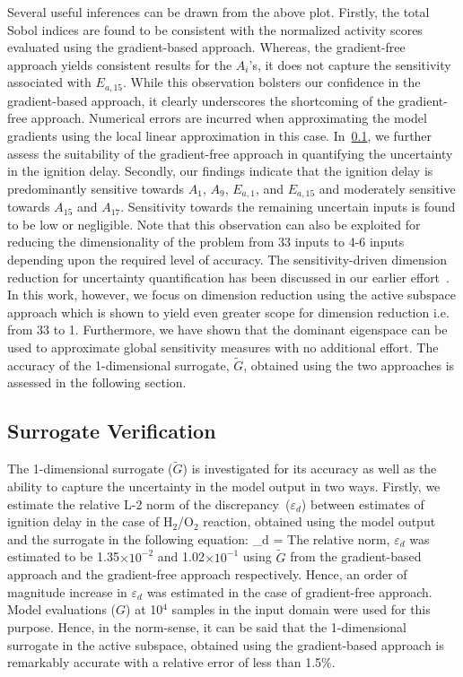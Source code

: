 Several useful inferences can be drawn from the above plot. Firstly, the total Sobol indices are found to be
consistent
with the normalized activity scores evaluated using the gradient-based approach. Whereas, the gradient-free
approach yields consistent results for the $A_i$'s, it does not capture the sensitivity associated with
$E_{a,15}$. While this observation bolsters our confidence in the gradient-based approach, it clearly
underscores the shortcoming of the gradient-free approach. Numerical errors are incurred when approximating
the model gradients using the local linear approximation in this case. In~\ref{sub:verify}, we further assess the
suitability of the gradient-free approach in quantifying the uncertainty in the ignition delay. 
Secondly, our findings indicate that   
the ignition delay is predominantly sensitive towards $A_1$, $A_9$, $E_{a,1}$, and $E_{a,15}$ and 
moderately sensitive towards $A_{15}$ and $A_{17}$. Sensitivity towards the remaining uncertain inputs is
found to be low or negligible. Note that this observation can also be exploited for reducing the 
dimensionality of the problem from 33 inputs to 4-6 inputs depending upon the required level of accuracy.
The sensitivity-driven dimension reduction for uncertainty quantification has been
discussed in our earlier effort~\cite{Vohra:2018}. In this work, however, we focus on dimension reduction using the active 
subspace approach which is shown to yield even greater scope for dimension reduction i.e. from 33 to 1. Furthermore, we have
shown that the dominant eigenspace can be used to approximate global sensitivity measures with no additional effort.
The accuracy of the 1-dimensional surrogate, $\tilde{G}$, obtained using the two approaches is assessed in the following section. 

\subsection{Surrogate Verification}
\label{sub:verify}

The 1-dimensional surrogate ($\tilde{G}$) is investigated for its accuracy as well as the ability to capture the 
uncertainty in the
model output in two ways. Firstly, we estimate the relative L-2 norm of the discrepancy~($\varepsilon_d$)
between estimates of ignition delay in the case of H$_2$/O$_2$ reaction, obtained using the 
model output and the surrogate in the following equation:
%
\be
\varepsilon_d = 
\ee
%
The relative norm, $\varepsilon_d$ was estimated to be 1.35$\times10^{-2}$ and 1.02$\times10^{-1}$
using $\tilde{G}$ from the gradient-based approach and the gradient-free approach respectively. Hence,
an order of magnitude increase in $\varepsilon_d$ was estimated in the case of gradient-free approach.
Model evaluations ($G$) at 10$^{4}$ samples in the input domain were used for this purpose. 
Hence, in the norm-sense, it can be said that the 1-dimensional surrogate in the active subspace, obtained
using the gradient-based approach is remarkably accurate with a relative error of less than 1.5$\%$.

